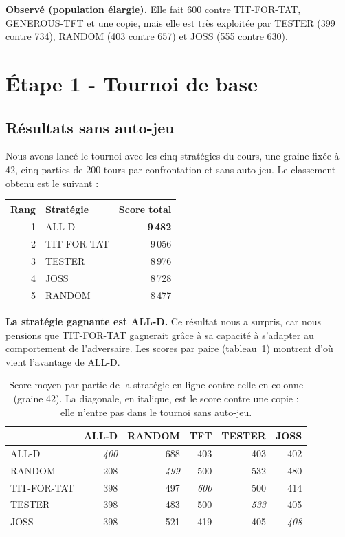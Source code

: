 \documentclass[10pt,a4paper]{article}
\begin{document}
\textbf{Observé (population élargie).} Elle fait 600 contre TIT-FOR-TAT, GENEROUS-TFT et une copie, mais elle est très exploitée
par TESTER (399 contre 734), RANDOM (403 contre 657) et JOSS (555 contre 630).

\section{Étape 1 - Tournoi de base}

\subsection{Résultats sans auto-jeu}
Nous avons lancé le tournoi avec les cinq stratégies du cours, une graine fixée à 42, cinq parties de 200 tours par
confrontation et sans auto-jeu. Le classement obtenu est le suivant :
\begin{center}
\small
\begin{tabular}{@{}rlr@{}}
\toprule
Rang & Stratégie & Score total \\
\midrule
1 & ALL-D & \textbf{9\,482} \\
2 & TIT-FOR-TAT & 9\,056 \\
3 & TESTER & 8\,976 \\
4 & JOSS & 8\,728 \\
5 & RANDOM & 8\,477 \\
\bottomrule
\end{tabular}
\end{center}

\textbf{La stratégie gagnante est ALL-D.} Ce résultat nous a surpris, car nous pensions que TIT-FOR-TAT gagnerait grâce à sa
capacité à s'adapter au comportement de l'adversaire. Les scores par paire (tableau~\ref{tab:matrice}) montrent d'où vient
l'avantage de ALL-D.

\begin{table}[htbp]
\centering
\small
\begin{tabular}{@{}lrrrrr@{}}
\toprule
  & ALL-D & RANDOM & TFT & TESTER & JOSS \\
\midrule
ALL-D & \textit{400} & 688 & 403 & 403 & 402 \\
RANDOM & 208 & \textit{499} & 500 & 532 & 480 \\
TIT-FOR-TAT & 398 & 497 & \textit{600} & 500 & 414 \\
TESTER & 398 & 483 & 500 & \textit{533} & 405 \\
JOSS & 398 & 521 & 419 & 405 & \textit{408} \\
\bottomrule
\end{tabular}
\caption{Score moyen par partie de la stratégie en ligne contre celle en colonne (graine 42). La diagonale, en italique, est
le score contre une copie : elle n'entre pas dans le tournoi sans auto-jeu.}
\label{tab:matrice}
\end{table}
\end{document}
